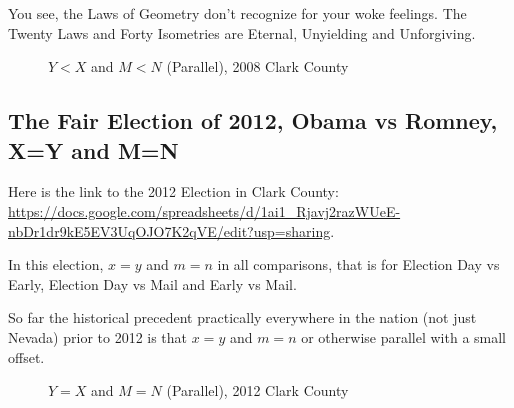 \documentclass[preprint,13pt]{elsarticle}
\begin{document}
You see, the Laws of Geometry don't recognize for your woke feelings. The Twenty Laws and Forty Isometries are Eternal, Unyielding and Unforgiving.
\begin{figure}[bp!]
\begin{center}
\caption{$Y<X$ and $M<N$ (Parallel), 2008 Clark County}
\noindent{}
\end{center}
\end{figure}
\newpage
\subsection{The Fair Election of 2012, Obama vs Romney, X=Y and M=N}

Here is the link to the 2012 Election in Clark County: \url{https://docs.google.com/spreadsheets/d/1ai1_Rjavj2razWUeE-nbDr1dr9kE5EV3UqOJO7K2qVE/edit?usp=sharing}.

In this election, $x=y$ and $m=n$ in all comparisons, that is for Election Day vs Early, Election Day vs Mail and Early vs Mail.

So far the historical precedent practically everywhere in the nation (not just Nevada) prior to 2012 is that $x=y$ and $m=n$ or otherwise parallel with a small offset.
\begin{figure}[bp!]
\begin{center}
\caption{$Y=X$ and $M=N$ (Parallel), 2012 Clark County}
\noindent{}
\end{center}
\end{figure}
\newpage
\end{document}
